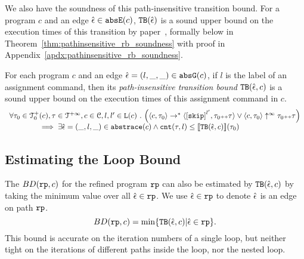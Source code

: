 We also have the soundness of this path-insensitive transition bound. For a program $c$ and an edge $\hat{\mathtt{\epsilon}{}} \in \mathtt{abs}{\mathtt{E}}(c)$,
${\mathtt{TB}}(\hat{\mathtt{\epsilon}{}})$ is a sound upper bound
on the execution times of this transition by paper~\cite{SinnZV17}, formally below in Theorem~\ref{thm:pathinsensitive_rb_soundness} with proof in Appendix~\ref{apdx:pathinsensitive_rb_soundness}.
%
\begin{thm}
  \label{thm:pathinsensitive_rb_soundness}
For each program ${c}$ and an edge $\hat{\mathtt{\epsilon}{}} = (l, \_, \_) \in \mathtt{abs}{\mathtt{G}}(c)$, if $l$ is the label of an assignment command,
then its \emph{path-insensitive transition bound} ${\mathtt{TB}}(\hat{\mathtt{\epsilon}{}}, c)$ 
 is a sound upper bound on 
the execution times of this assignment command in $c$.
  \[
    \begin{array}{l}
      \forall \trace_0 \in \ftdom_0(c), \trace \in \tdom, c \in \cdom, l, l' \in \lvar(c) \st
      \Big( \config{c, \trace_0} \rightarrow^{*} \config{\clabel{\eskip}^{l'}, \trace_0 \tracecat \trace} 
        \lor  \config{c, \trace_0} \uparrow^{\infty} \trace_0 \tracecat \trace \Big)
       \\ \qquad \qquad
       \implies
       \exists \absevent = (\_, l, \_) \in \absflow(c) \land
      \counter(\trace, l) \leq \econfig{\absclr(\absevent, c)}(\trace_0)
    \end{array}
  \]
\end{thm}
%
\subsection{Estimating the Loop Bound} 
The $BD(\mathtt{rp}, c)$ for the refined program $\mathtt{rp}$ can also be estimated by ${\mathtt{TB}}(\hat{\mathtt{\epsilon}{}}, c)$ by taking the
minimum value over all $\hat{\mathtt{\epsilon}{}} \in \mathtt{rp}$.
We use $\hat{\mathtt{\epsilon}{}} \in \mathtt{rp}$ to denote $\hat{\mathtt{\epsilon}{}}$ is an edge on path $\mathtt{rp}$.
\begin{equation}
  \label{eq:absBD}
  BD(\rprog, c) = \min\left\{ \absclr(\absevent, c) \middle\vert \absevent \in \rprog \right\}.
\end{equation}
%
This bound is accurate on the iteration numbers of a single loop, but neither tight on the iterations of different paths inside the loop, nor the nested loop.
%